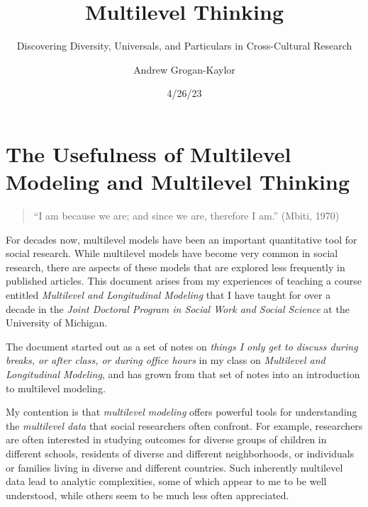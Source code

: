 \documentclass[
  letterpaper,
  DIV=11,
  numbers=noendperiod]{scrreprt}
\title{Multilevel Thinking}
\subtitle{Discovering Diversity, Universals, and Particulars in
Cross-Cultural Research}
\author{Andrew Grogan-Kaylor}
\date{4/26/23}
\renewcommand*\contentsname{Table of contents}
\newcommand\contentsname{Table of contents}
\begin{document}
\maketitle
\ifdefined\Shaded\renewenvironment{Shaded}{\begin{tcolorbox}[borderline west={3pt}{0pt}{shadecolor}, frame hidden, interior hidden, enhanced, boxrule=0pt, breakable, sharp corners]}{\end{tcolorbox}}\fi

\renewcommand*\contentsname{Table of contents}
{
\hypersetup{linkcolor=}
\setcounter{tocdepth}{2}
\tableofcontents
}
\listoffigures
\listoftables
{}

\hypertarget{the-usefulness-of-multilevel-modeling-and-multilevel-thinking}{%
\chapter{The Usefulness of Multilevel Modeling and Multilevel
Thinking}\label{the-usefulness-of-multilevel-modeling-and-multilevel-thinking}}

\begin{quote}
``I am because we are; and since we are, therefore I am.'' (Mbiti, 1970)
\end{quote}

For decades now, multilevel models have been an important quantitative
tool for social research. While multilevel models have become very
common in social research, there are aspects of these models that are
explored less frequently in published articles. This document arises
from my experiences of teaching a course entitled \emph{Multilevel and
Longitudinal Modeling} that I have taught for over a decade in the
\emph{Joint Doctoral Program in Social Work and Social Science} at the
University of Michigan.

The document started out as a set of notes on \emph{things I only get to
discuss during breaks, or after class, or during office hours} in my
class on \emph{Multilevel and Longitudinal Modeling}, and has grown from
that set of notes into an introduction to multilevel modeling.

My contention is that \emph{multilevel modeling} offers powerful tools
for understanding the \emph{multilevel data} that social researchers
often confront. For example, researchers are often interested in
studying outcomes for diverse groups of children in different schools,
residents of diverse and different neighborhoods, or individuals or
families living in diverse and different countries. Such inherently
multilevel data lead to analytic complexities, some of which appear to
me to be well understood, while others seem to be much less often
appreciated.
\end{document}
